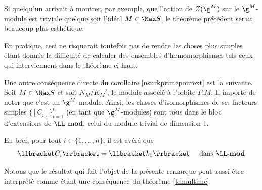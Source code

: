 \begin{Rem} \label{aubordduprecipice} Si quelqu'un arrivait à montrer, par exemple, que l'action de $Z(\g^M)$ sur le $\g^M$-module est triviale quelque soit l'idéal $M \in \Max S$, le théorème précédent serait beaucoup plus esthétique. 

En pratique, ceci ne risquerait toutefois pas de rendre les choses plus simples étant donnée la difficulté de calculer des ensembles d'homomorphismes tels ceux qui interviennent dans le théorème ci-haut.
\end{Rem}

\begin{Rem} Une autre conséquence directe du corollaire \ref{nsurkprimepourext} est la suivante. Soit $M \in \Max S$ et soit $N_M/K_M'$, le module associé à l'orbite $\Gamma.M$. Il importe de noter que c'est un $\g^M$-module. Ainsi, les classes d'isomorphismes de ses facteurs simples $\{[C_i]\}_{i=1}^n$ (en tant que $\g^M$-modules) sont tous dans le bloc d'extensions de $\LL$-$\mathbf{mod}$, celui du module trivial de dimension 1. 

En bref, pour tout $i \in \{1,...\,,n\}$, il est avéré que
$$ \llbracket C_i \rrbracket = \llbracket k_0 \rrbracket \quad \text{ dans } \LL\text{-}\mathbf{mod} $$

Notons que le résultat qui fait l'objet de la présente remarque peut aussi être interprété comme étant une conséquence du théorème \ref{thmultime}.
\end{Rem}